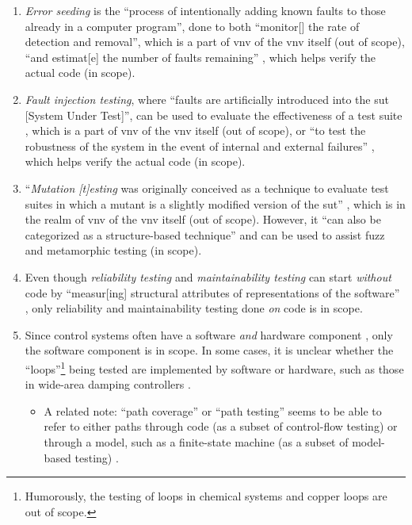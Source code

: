 \begin{enumerate}
    \item \emph{Error seeding} is the ``process of intentionally adding
          known faults to those already in a computer program'',
          done to both ``monitor[] the rate of detection and removal'',
          which is a part of \acs{vnv} of the \acs{vnv} itself (out of scope),
          ``and estimat[e] the number of faults remaining''
          \citep[p.~165]{IEEE2017}, which helps verify the actual code (in scope).
    \item \emph{Fault injection testing}, where ``faults are artificially
          introduced into the \acs{sut} [System Under Test]'', can be used to
          evaluate the effectiveness of a test suite \citep[p.~5-18]{SWEBOK2024},
          which is a part of \acs{vnv} of the \acs{vnv} itself (out of scope),
          or ``to test
          the robustness of the system in the event of internal and
          external failures'' \citep[p.~42]{IEEE2022}, which helps verify
          the actual code (in scope).
    \item ``\emph{Mutation [t]esting} was originally conceived as a
          technique to evaluate test suites in which a mutant is a slightly
          modified version of the \acs{sut}'' \citep[p.~5-15]{SWEBOK2024},
          which is in the realm of \acs{vnv} of the \acs{vnv} itself (out of
          scope). However, it ``can also be categorized as a structure-based
          technique'' and can be used to assist fuzz and metamorphic testing
          \citep[p.~5-15]{SWEBOK2024} (in scope).
          \ifnotpaper
    \item Even though \emph{reliability testing} and \emph{maintainability
              testing} can start \emph{without} code by ``measur[ing]
          structural attributes of representations of the software''
          \citep[p.~18]{FentonAndPfleeger1997}, only reliability and
          maintainability testing done \emph{on} code is in scope.
    \item Since control systems often have a software \emph{and} hardware
          component \citep{ISO2015, PreußeEtAl2012,ForsythEtAl2004},
          only the software component is in scope. In some cases, it is
          unclear whether the ``loops''\footnote{Humorously, the testing of
              loops in chemical systems \citep{Dominguez-PumarEtAl2020} and
              copper loops \citep{Goralski1999} are out of scope.} being
          tested are implemented by software or hardware, such as those in
          wide-area damping controllers \citep{PierreEtAl2017, TrudnowskiEtAl2017}.
          \begin{itemize}
              \item A related note: ``path coverage'' or ``path testing''
                    seems to be able to refer to either paths through code
                    (as a subset of control-flow testing)
                    \citep[p.~5-13]{SWEBOK2024} or through a model, such as
                    a finite-state machine (as a subset of model-based
                    testing) \citep[p.~184]{DoğanEtAl2014}.
          \end{itemize}
          \fi
\end{enumerate}

